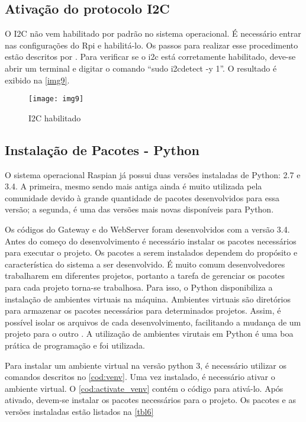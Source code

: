 		\subsection{Ativação do protocolo I2C}
			O I2C não vem habilitado por padrão no sistema operacional. É necessário entrar nas configurações do Rpi e habilitá-lo. Os passos para realizar esse procedimento estão descritos por \textcite{matt2014}. Para verificar se o i2c está corretamente habilitado, deve-se abrir um terminal e digitar o comando ``sudo i2cdetect -y 1''. O resultado é exibido na \autoref{img9}.
			
			\begin{figure}[!htb]	
				\captionsetup{justification=centering}
				\begin{center}
					\texttt{[image: img9]}  %
					\caption[I2C habilitado]{\label{img9}I2C habilitado}
				\end{center}		
			\end{figure}
		
		\subsection{Instalação de Pacotes - Python}
			O sistema operacional Raspian já possui duas versões instaladas de Python: 2.7 e 3.4. A primeira, mesmo sendo mais antiga ainda é muito utilizada pela comunidade devido à grande quantidade de pacotes desenvolvidos para essa versão; a segunda, é uma das versões mais novas disponíveis para Python.
			
			Os códigos do Gateway e do WebServer foram desenvolvidos com a versão 3.4. Antes do começo do desenvolvimento é necessário instalar os pacotes necessários para executar o projeto. Os pacotes a serem instalados dependem do propósito e característica do sistema a ser desenvolvido. É muito comum desenvolvedores trabalharem em diferentes projetos, portanto a tarefa de gerenciar os pacotes para cada projeto torna-se trabalhosa. Para isso, o Python disponibiliza a instalação de ambientes virtuais na máquina. Ambientes virtuais são diretórios para armazenar os pacotes necessários para determinados projetos. Assim, é possível isolar os arquivos de cada desenvolvimento, facilitando a mudança de um projeto para o outro \cite{kyle2017}. A utilização de ambientes virutais em Python é uma boa prática de programação e foi utilizada.
			
			Para instalar um ambiente virtual na versão python 3, é necessário utilizar os comandos descritos no \autoref{cod:venv}. Uma vez instalado, é necessário ativar o ambiente virtual. O  \autoref{cod:activate_venv} contém o código para ativá-lo. Após ativado, devem-se instalar os pacotes necessários para o projeto.  Os pacotes e as versões instaladas estão listados na \autoref{tbl6}
			
